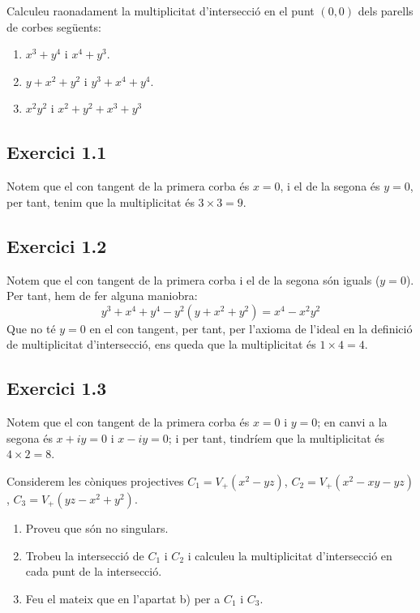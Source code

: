 \documentclass[11pt, a4paper]{article}
\begin{document}
\pagestyle{fancy}
% 
\begin{tcolorbox}[title=\section{Exercici 1}(2 punts)]
Calculeu raonadament la multiplicitat d'intersecció en el punt $(0, 0)$ dels parells de corbes següents:
\begin{enumerate}
    \item $x^3 + y^4$ i $x^4 + y^3$.
    \item $y+x^2+y^2$ i $y^3+x^4+y^4$.
    \item $x^2y^2$ i $x^2+y^2+x^3+y^3$
\end{enumerate}
\end{tcolorbox}
\subsection{Exercici 1.1}
Notem que el con tangent de la primera corba és $x=0$, i el de la segona és $y=0$, per tant, tenim que la multiplicitat és $3\times 3=9$.
\subsection{Exercici 1.2}
Notem que el con tangent de la primera corba i el de la segona són iguals ($y=0$). Per tant, hem de fer alguna maniobra:
\[
    y^3+x^4+y^4-y^2(y+x^2+y^2)=x^4-x^2y^2
\]
Que no té $y=0$ en el con tangent, per tant, per l'axioma de l'ideal en la definició de multiplicitat d'intersecció, ens queda que la multiplicitat és $1\times 4=4$.
\subsection{Exercici 1.3}
Notem que el con tangent de la primera corba és $x=0$ i $y=0$; en canvi a la segona és $x+iy=0$ i $x-iy=0$; i per tant, tindríem que la multiplicitat és $4\times 2=8$.
\newpage
\begin{tcolorbox}[title=\section{Exercici 2} (2 punts)]
    Considerem les còniques projectives $C_1 = V_+(x^2-yz)$, $C_2=V_+(x^2-xy-yz)$, $C_3=V_+(yz-x^2+y^2)$.
    \begin{enumerate}
        \item Proveu que són no singulars.
        \item Trobeu la intersecció de $C_1$ i $C_2$ i calculeu la multiplicitat d'intersecció en cada punt de la intersecció.
        \item Feu el mateix que en l'apartat b) per a $C_1$ i $C_3$.
    \end{enumerate}
\end{tcolorbox}
\end{document}

